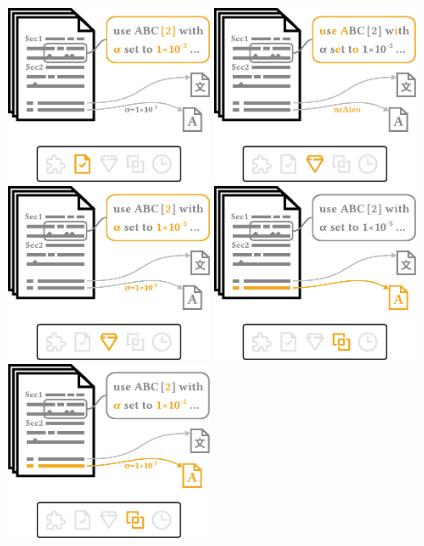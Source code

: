 \documentclass[en,16:9,smallfoot]{sdqbeamer}
\begin{document}
\begin{frame}
\begin{overprint}
            \centering\includegraphics[width=0.4\textwidth]{imgs/schema_asp_1_1}
            \centering\includegraphics[width=0.4\textwidth]{imgs/schema_asp_2_0}
            \centering\includegraphics[width=0.4\textwidth]{imgs/schema_asp_2_1}
            \centering\includegraphics[width=0.4\textwidth]{imgs/schema_asp_3_0}
            \centering\includegraphics[width=0.4\textwidth]{imgs/schema_asp_3_1}

\end{overprint}
\end{frame}
\end{document}

